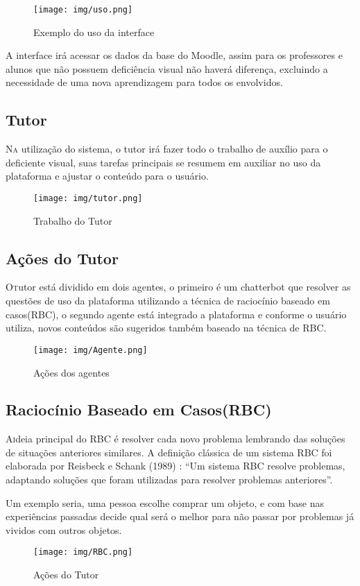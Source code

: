\begin{figure}[htbp!]
\centering
\texttt{[image: img/uso.png]}
\caption{Exemplo do uso da interface}
\label{fig:uso}
\end{figure}

A interface irá acessar os dados da base do Moodle, assim para os professores e alunos que não possuem deficiência visual não haverá diferença, excluindo a necessidade de uma nova aprendizagem para todos os envolvidos.

\subsection{Tutor}
\lettrine{N}{a} utilização do sistema, o tutor irá fazer todo o trabalho de auxílio para o deficiente visual, suas tarefas principais se resumem em auxiliar no uso da plataforma e ajustar o conteúdo para o usuário.

\begin{figure}[htbp!]
\centering
\texttt{[image: img/tutor.png]}
\caption{Trabalho do Tutor}
\label{fig:tutor}
\end{figure}

\subsection{Ações do Tutor}
\lettrine{O} tutor está dividido em dois agentes, o primeiro é um chatterbot que resolver as questões de uso da plataforma utilizando a técnica de raciocínio baseado em casos(RBC), o segundo agente está integrado a plataforma e conforme o usuário utiliza, novos conteúdos são sugeridos também baseado na técnica de RBC.

\begin{figure}[htbp!]
\centering
\texttt{[image: img/Agente.png]}
\caption{Ações dos agentes}
\label{fig:agente}
\end{figure}

\subsection{Raciocínio Baseado em Casos(RBC)}
\lettrine{A} ideia principal do RBC é resolver cada novo problema lembrando das soluções de situações anteriores similares. A definição clássica de um sistema RBC foi elaborada por Reisbeck e Schank (1989) \citep{Riesbeck}: “Um sistema RBC resolve problemas, adaptando soluções que foram utilizadas para resolver problemas anteriores”.

Um exemplo seria, uma pessoa escolhe comprar um objeto, e com base nas experiências passadas decide qual será o melhor para não passar por problemas já vividos com outros objetos.

\begin{figure}[htbp!]
\centering
\texttt{[image: img/RBC.png]}
\caption{Ações do Tutor}
\label{fig:Ciclo RBC}
\end{figure}
